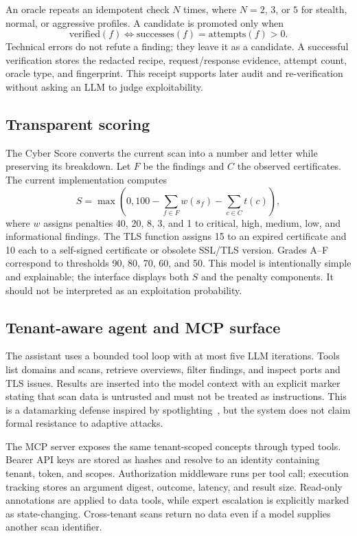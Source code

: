 \documentclass[conference,a4paper]{IEEEtran}
\begin{document}
An oracle repeats an idempotent check $N$ times, where $N=2$, $3$, or $5$ for stealth, normal, or aggressive profiles. A candidate is promoted only when
\begin{equation}
    \mathrm{verified}(f) \iff \mathrm{successes}(f)=\mathrm{attempts}(f)>0.
\end{equation}
Technical errors do not refute a finding; they leave it as a candidate. A successful verification stores the redacted recipe, request/response evidence, attempt count, oracle type, and fingerprint. This receipt supports later audit and re-verification without asking an LLM to judge exploitability.

\subsection{Transparent scoring}

The Cyber Score converts the current scan into a number and letter while preserving its breakdown. Let $F$ be the findings and $C$ the observed certificates. The current implementation computes
\begin{equation}
S=\max\left(0,100-\sum_{f\in F}w(s_f)-\sum_{c\in C}t(c)\right),
\end{equation}
where $w$ assigns penalties 40, 20, 8, 3, and 1 to critical, high, medium, low, and informational findings. The TLS function assigns 15 to an expired certificate and 10 each to a self-signed certificate or obsolete SSL/TLS version. Grades A--F correspond to thresholds 90, 80, 70, 60, and 50. This model is intentionally simple and explainable; the interface displays both $S$ and the penalty components. It should not be interpreted as an exploitation probability.

\subsection{Tenant-aware agent and MCP surface}

The assistant uses a bounded tool loop with at most five LLM iterations. Tools list domains and scans, retrieve overviews, filter findings, and inspect ports and TLS issues. Results are inserted into the model context with an explicit marker stating that scan data is untrusted and must not be treated as instructions. This is a datamarking defense inspired by spotlighting~\cite{Hines2024Spotlighting}, but the system does not claim formal resistance to adaptive attacks.

The MCP server exposes the same tenant-scoped concepts through typed tools. Bearer API keys are stored as hashes and resolve to an identity containing tenant, token, and scopes. Authorization middleware runs per tool call; execution tracking stores an argument digest, outcome, latency, and result size. Read-only annotations are applied to data tools, while expert escalation is explicitly marked as state-changing. Cross-tenant scans return no data even if a model supplies another scan identifier.
\end{document}
